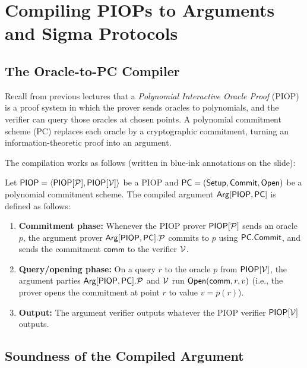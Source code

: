 \documentclass[11pt]{article}
\begin{document}
\section{Compiling PIOPs to Arguments and Sigma Protocols}

\subsection{The Oracle-to-PC Compiler}

Recall from previous lectures that a \emph{Polynomial Interactive Oracle Proof} (PIOP) is a proof system in which the prover sends oracles to polynomials, and the verifier can query those oracles at chosen points. A polynomial commitment scheme (PC) replaces each oracle by a cryptographic commitment, turning an information-theoretic proof into an argument.

The compilation works as follows (written in blue-ink annotations on the slide):

\begin{tcolorbox}[colback=blue!5!white, colframe=blue!60!black,
                  title={Oracle-to-PC Compiler: $\mathsf{Arg}[\mathsf{PIOP}, \mathsf{PC}]$}]
Let $\mathsf{PIOP} = \langle \mathsf{PIOP}[\mathcal{P}], \mathsf{PIOP}[\mathcal{V}] \rangle$ be a PIOP and $\mathsf{PC} = (\mathsf{Setup}, \mathsf{Commit}, \mathsf{Open})$ be a polynomial commitment scheme. The compiled argument $\mathsf{Arg}[\mathsf{PIOP}, \mathsf{PC}]$ is defined as follows:

\begin{enumerate}
  \item \textbf{Commitment phase:} Whenever the PIOP prover $\mathsf{PIOP}[\mathcal{P}]$ sends an oracle $p$, the argument prover $\mathsf{Arg}[\mathsf{PIOP},\mathsf{PC}].\mathcal{P}$ commits to $p$ using $\mathsf{PC}.\mathsf{Commit}$, and sends the commitment $\mathsf{comm}$ to the verifier $\mathcal{V}$.
  \item \textbf{Query/opening phase:} On a query $r$ to the oracle $p$ from $\mathsf{PIOP}[\mathcal{V}]$, the argument parties $\mathsf{Arg}[\mathsf{PIOP},\mathsf{PC}].\mathcal{P}$ and $\mathcal{V}$ run $\mathsf{Open}(\mathsf{comm}, r, v)$ (i.e., the prover opens the commitment at point $r$ to value $v = p(r)$).
  \item \textbf{Output:} The argument verifier outputs whatever the PIOP verifier $\mathsf{PIOP}[\mathcal{V}]$ outputs.
\end{enumerate}
\end{tcolorbox}

\subsection{Soundness of the Compiled Argument}
\end{document}
